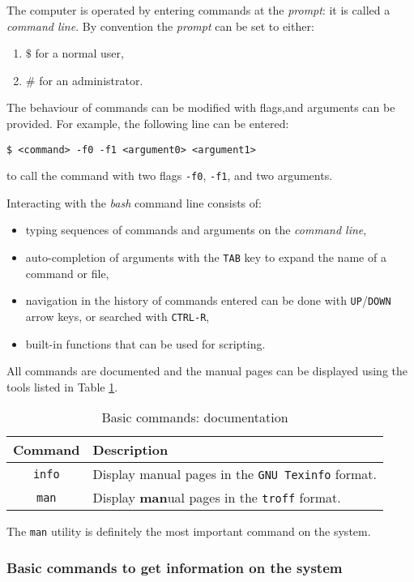 \documentclass[onecolumn, oneside, a4paper, 11pt]{memoir}
\theoremstyle{remark}
\begin{document}
The computer is operated by entering commands at the \textit{prompt}: it is called a \textit{command line}.
By convention the \textit{prompt} can be set to either:
\begin{enumerate}
\item $\$$ for a normal user,
\item $\#$ for an administrator.
\end{enumerate}

\medskip
The behaviour of commands can be modified with flags,and arguments can be provided.
For example, the following line can be entered:
\begin{lstlisting}[style=shell]
$ <command> -f0 -f1 <argument0> <argument1>
\end{lstlisting}
to call the command with two flags \texttt{-f0}, \texttt{-f1}, and two arguments.

\bigskip
Interacting with the \textit{bash} command line consists of:
\begin{itemize}
\item typing sequences of commands and arguments on the \textit{command line},
\item auto-completion of arguments with the \texttt{TAB} key to expand the name of a command or file,
\item navigation in the history of commands entered can be done with \texttt{UP}/\texttt{DOWN} arrow keys, or searched with \texttt{CTRL-R},
\item built-in functions that can be used for scripting.
\end{itemize}

\bigskip
All commands are documented and the manual pages can be displayed using the tools listed in Table \ref{tab:doc}.
\begin{table}[h!]
\centering
\caption{Basic commands: documentation}
\label{tab:doc}
\begin{tabular}{|c|l|}
  \hline
  Command & Description \\
  \hline
  \texttt{info} & Display manual pages in the \texttt{GNU Texinfo} format. \\
  \texttt{man}  & Display \textbf{man}ual pages in the \texttt{troff} format. \\
  \hline
\end{tabular}
\end{table}

The \texttt{man} utility is definitely the most important command on the system.


\subsubsection{Basic commands to get information on the system}
\end{document}
